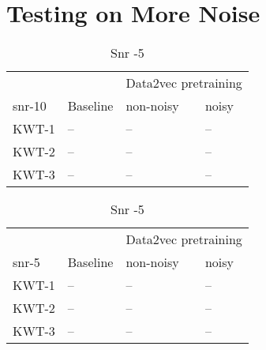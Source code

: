 \section{Testing on More Noise}
\begin{table}[ht]
    \centering
    \begin{subtable}[ht]{0.45\textwidth}
        \centering
        \begin{tabular}{@{}llll@{}}
        \toprule
        & & \multicolumn{2}{c}{Data2vec pretraining} \\ \cline{3-4}
        snr-10    & Baseline & non-noisy & noisy \\ \midrule
        KWT-1    & --  & -- & -- \\
        KWT-2    & --  & -- & -- \\
        KWT-3    & --  & -- & -- \\
        \bottomrule
        \end{tabular}
        \caption{Snr -10}
    \end{subtable}
    \hfill
    \begin{subtable}[ht]{0.45\textwidth}
        \centering
        \begin{tabular}{@{}llll@{}}
        \toprule
        & & \multicolumn{2}{c}{Data2vec pretraining} \\ \cline{3-4}
        snr-5    & Baseline & non-noisy & noisy \\ \midrule
        KWT-1    & --  & -- & -- \\
        KWT-2    & --  & -- & -- \\
        KWT-3    & --  & -- & -- \\
        \bottomrule
        \end{tabular}
        \caption{Snr -5}
    \end{subtable}
     
     
    \bigskip



\end{table}
